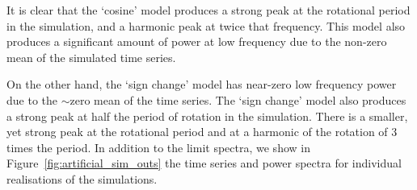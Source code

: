 It is clear that the `cosine' model produces a strong peak at the rotational period in the simulation, and a harmonic peak at twice that frequency. This model also produces a significant amount of power at low frequency due to the non-zero mean of the simulated time series. 

On the other hand, the `sign change' model has near-zero low frequency power due to the $\sim$zero mean of the time series. The `sign change' model also produces a strong peak at half the period of rotation in the simulation. There is a smaller, yet strong peak at the rotational period and at a harmonic of the rotation of 3 times the period. In addition to the limit spectra, we show in Figure~\ref{fig:artificial_sim_outs} the time series and power spectra for individual realisations of the simulations.


